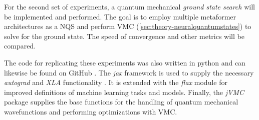 For the second set of experiments, a quantum mechanical \emph{ground state search} will be implemented and performed.
The goal is to employ multiple metaformer architectures as a NQS and perform VMC (\autoref{sec:theory-neuralquantumstates}) to solve for the ground state.
The speed of convergence and other metrics will be compared.

The code for replicating these experiments was also written in python and can likewise be found on GitHub \cite{selfPhysics}.
The \emph{jax} framework is used to supply the necessary \emph{autograd} and \emph{XLA} functionality \cite{jaxGithub}.
It is extended with the \emph{flax} \cite{flaxGithub} module for improved definitions of machine learning tasks and models.
Finally, the \emph{jVMC} \cite{jVMCgithub} package supplies the base functions for the handling of quantum mechanical wavefunctions and performing optimizations with VMC.
